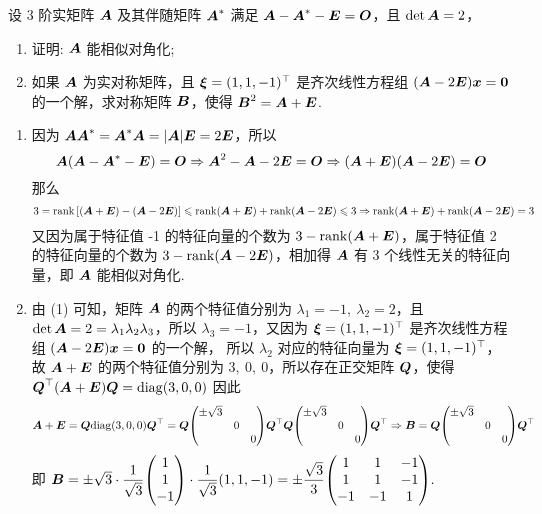 \begin{example}
    设 3 阶实矩阵 $\vb*{A}$ 及其伴随矩阵 $\vb*{A}^*$ 满足 $\vb*{A}-\vb*{A}^*-\vb*{E}=\vb*{O}$，且 $\det\vb*{A}=2$，
    \begin{enumerate}[label=(\arabic{*})]
        \item 证明: $\vb*{A}$ 能相似对角化;
        \item 如果 $\vb*{A}$ 为实对称矩阵，且 $\vb*{\xi}=(1,1,-1)^\top$ 是齐次线性方程组 $(\vb*{A}-2\vb*{E})\vb*{x}=\vb*{0}$ 的一个解，求对称矩阵 $\vb*{B}$，使得 $\vb*{B}^2=\vb*{A}+\vb*{E}$.
    \end{enumerate}
\end{example}
\begin{solution}
    \begin{enumerate}[label=(\arabic{*})]
        \item 因为 $\vb*{AA}^*=\vb*{A}^*\vb*{A}=|\vb*{A}|\vb*{E}=2\vb*{E}$，所以
              $$\vb*{A}\qty(\vb*{A}-\vb*{A}^*-\vb*{E})=\vb*{O}\Rightarrow \vb*{A}^2-\vb*{A}-2\vb*{E}=\vb*{O}\Rightarrow (\vb*{A}+\vb*{E})(\vb*{A}-2\vb*{E})=\vb*{O}$$
              那么 $$3=\rank\qty[(\vb*{A}+\vb*{E})-(\vb*{A}-2\vb*{E})]\leqslant \rank(\vb*{A}+\vb*{E})+\rank(\vb*{A}-2\vb*{E})\leqslant 3\Rightarrow \rank(\vb*{A}+\vb*{E})+\rank(\vb*{A}-2\vb*{E})=3$$
              又因为属于特征值 -1 的特征向量的个数为 $3-\rank(\vb*{A}+\vb*{E})$，属于特征值 2 的特征向量的个数为 $3-\rank(\vb*{A}-2\vb*{E})$，相加得 $\vb*{A}$ 有 3 个线性无关的特征向量，即 $\vb*{A}$ 能相似对角化.
        \item 由 (1) 可知，矩阵 $\vb*{A}$ 的两个特征值分别为 $\lambda_1=-1,~\lambda_2=2$，且 $\det\vb*{A}=2=\lambda_1\lambda_2\lambda_3$，所以 $\lambda_3=-1$，又因为 $\vb*{\xi}=(1,1,-1)^\top$ 是齐次线性方程组 $(\vb*{A}-2\vb*{E})\vb*{x}=\vb*{0}$ 的一个解，
              所以 $\lambda_2$ 对应的特征向量为 $\vb*{\xi}=(1,1,-1)^\top$，故 $\vb*{A}+\vb*{E}$ 的两个特征值分别为 $3,~0,~0$，所以存在正交矩阵 $\vb*{Q}$，使得 $\vb*{Q}^\top(\vb*{A}+\vb*{E})\vb*{Q}=\mathrm{diag}(3,0,0)$
              因此 $$\vb*{A}+\vb*{E}=\vb*{Q}\diag(3,0,0)\vb*{Q}^\top=\vb*{Q}\mqty(\dmat{\pm\sqrt{3},0,0})\vb*{Q}^\top\vb*{Q}\mqty(\dmat{\pm\sqrt{3},0,0})\vb*{Q}^\top\Rightarrow \vb*{B}=\vb*{Q}\mqty(\dmat{\pm\sqrt{3},0,0})\vb*{Q}^\top$$
              即 $\vb*{B}=\pm\sqrt{3}\cdot\dfrac{1}{\sqrt{3}}\mqty(1\\1\\-1)\cdot\dfrac{1}{\sqrt{3}}(1,1,-1)=\pm\dfrac{\sqrt{3}}{3}\mqty(1&1&-1\\1&1&-1\\-1&-1&1).$
    \end{enumerate}
\end{solution}

